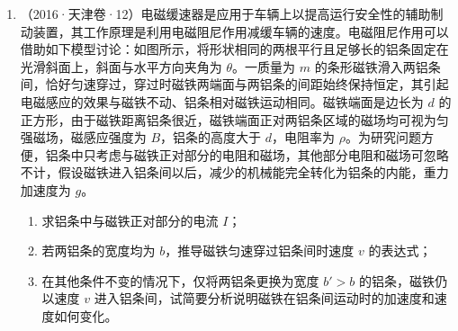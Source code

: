 \documentclass[\gkver]{gaokaozhenti}
\newcommand{\source}[1]{{\sffamily（#1）}}
\begin{document}
\begin{enumerate}[resume]
\item
\source{2016·天津卷·12}电磁缓速器是应用于车辆上以提高运行安全性的辅助制动装置，其工作原理是利用电磁阻尼作用减缓车辆的速度。电磁阻尼作用可以借助如下模型讨论：如图所示，将形状相同的两根平行且足够长的铝条固定在光滑斜面上，斜面与水平方向夹角为 $\theta$。一质量为 $m$ 的条形磁铁滑入两铝条间，恰好匀速穿过，穿过时磁铁两端面与两铝条的间距始终保持恒定，其引起电磁感应的效果与磁铁不动、铝条相对磁铁运动相同。磁铁端面是边长为 $d$ 的正方形，由于磁铁距离铝条很近，磁铁端面正对两铝条区域的磁场均可视为匀强磁场，磁感应强度为 $B$，铝条的高度大于 $d$，电阻率为 $\rho$。为研究问题方便，铝条中只考虑与磁铁正对部分的电阻和磁场，其他部分电阻和磁场可忽略不计，假设磁铁进入铝条间以后，减少的机械能完全转化为铝条的内能，重力加速度为 $g$。
\begin{enumerate}
	\item
	求铝条中与磁铁正对部分的电流 $I$；
	\item
	若两铝条的宽度均为 $b$，推导磁铁匀速穿过铝条间时速度 $v$ 的表达式；
	\item
	在其他条件不变的情况下，仅将两铝条更换为宽度 $b'>b$ 的铝条，磁铁仍以速度 $v$ 进入铝条间，试简要分析说明磁铁在铝条间运动时的加速度和速度如何变化。
\end{enumerate}

\end{enumerate}
\end{document}
